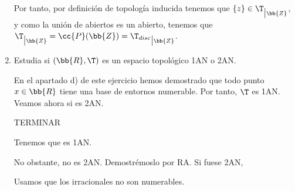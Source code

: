 \begin{ejercicio}
\begin{enumerate}[label=\alph*)]
        Por tanto, por definición de topología inducida tenemos que $\{z\}\in \T_{\big | \bb{Z}}$, y como la unión de abiertos es un abierto, tenemos que $\T_{\big | \bb{Z}}=\cc{P}(\bb{Z})={\T_{disc}}_{\big| \bb{Z}}$.

        \item Estudia si $(\bb{R}, \T)$ es un espacio topológico 1AN o 2AN.

        En el apartado d) de este ejercicio hemos demostrado que todo punto $x\in \bb{R}$ tiene una base de entornos numerable. Por tanto, $\T$ es 1AN. Veamos ahora si es 2AN.

        TERMINAR

        Tenemos que es 1AN.
        
        No obstante, no es 2AN. Demostrémoslo por RA. Si fuese 2AN, 

        Usamos que los irracionales no son numerables.
    \end{enumerate}
\end{ejercicio}